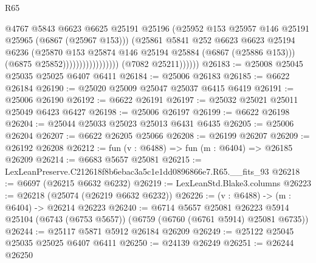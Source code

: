 \begin{lexlean}{R65}
\begin{coremodule}
{                                            @4767
                                            @5843
                                            @6623
                                            @6625
                                            @25191
                                            @25196
                                            (@25952
                                              @153
                                              @25957
                                              @146
                                              @25191
                                              @25965
                                              (@6867 (@25967 @153)))
                                            (@25861
                                              @5841
                                              @252
                                              @6623
                                              @6623
                                              @25194
                                              @6236
                                              (@25870
                                                @153
                                                @25874
                                                @146
                                                @25194
                                                @25884
                                                (@6867 (@25886 @153)))
                                              (@6875 @25852)))))))))))))))))
              (@7082 @25211))))))
@26183 := @25008 @25045 @25035 @25025 @6407 @6411
@26184 := @25006 @26183
@26185 := @6622 @26184
@26190 := @25020 @25009 @25047 @25037 @6415 @6419
@26191 := @25006 @26190
@26192 := @6622 @26191
@26197 := @25032 @25021 @25011 @25049 @6423 @6427
@26198 := @25006 @26197
@26199 := @6622 @26198
@26204 := @25044 @25033 @25023 @25013 @6431 @6435
@26205 := @25006 @26204
@26207 := @6622 @26205 @25066
@26208 := @26199 @26207
@26209 := @26192 @26208
@26212 := fun (v : @6488) => fun (m : @6404) => @26185 @26209
@26214 := @6683 @5657 @25081
@26215 := LexLeanPreserve.C212618f8b6ebac3a5c1e1dd0896866e7.R65.__fits_93
@26218 := @6697 (@26215 @6632 @6232)
@26219 := LexLeanStd.Blake3.columns
@26223 := @26218 (@25074 (@26219 @6632 @6232))
@26226 := (v : @6488) -> (m : @6404) -> @26214 @26223
@26240 := @6714
    @5657
    @25081
    @26223
    @5914
    @25104
    (@6743 (@6753 @5657))
    (@6759 (@6760 (@6761 @5914) @25081 @6735))
@26244 := @25117 @5871 @5912 @26184 @26209
@26249 := @25122 @25045 @25035 @25025 @6407 @6411
@26250 := @24139 @26249
@26251 := @26244 @26250
}
\end{coremodule}
\end{lexlean}

